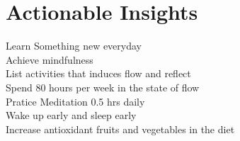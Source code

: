 \section*{Actionable Insights}
\begin{Form}
  \CheckBox[name=1]{} Learn Something new everyday\\
  \CheckBox[name=2]{} Achieve mindfulness\\
  \CheckBox[name=3]{} List activities that induces flow and reflect\\
  \CheckBox[name=4]{} Spend 80 hours per week in the state of flow\\
  \CheckBox[name=5]{} Pratice Meditation 0.5 hrs daily\\
  \CheckBox[name=6]{} Wake up early and sleep early\\
  \CheckBox[name=7]{} Increase antioxidant fruits and vegetables in the diet
\end{Form}